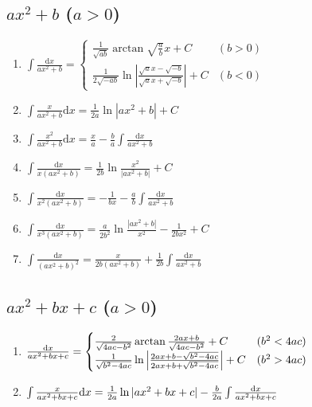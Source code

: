 \subsection{$ax^2+b$ ($a>0$)}

	\begin{enumerate}

	\item $ \int \frac{\mathrm{d}x}{ax^2+b} = \begin{cases}
	\frac{1}{\sqrt{ab}} \arctan \sqrt{\frac{a}{b}} x + C & (b > 0) \\
	\frac{1}{2\sqrt{-ab}} \ln\left| \frac{\sqrt{a}x-\sqrt{-b}}{\sqrt{a}x+\sqrt{-b}} \right| + C & (b < 0)
	\end{cases} $

	\item $ \int \frac{x}{ax^2+b} \mathrm{d}x = \frac{1}{2a} \ln \left| ax^2 + b \right| + C $

	\item $ \int \frac{x^2}{ax^2+b} \mathrm{d}x = \frac{x}{a} - \frac{b}{a}\int \frac{\mathrm{d}x}{ax^2+b} $

	\item $ \int \frac{\mathrm{d}x}{x(ax^2+b)} = \frac{1}{2b} \ln \frac{x^2}{|ax^2+b|} + C $

	\item $ \int \frac{\mathrm{d}x}{x^2(ax^2+b)} = -\frac{1}{bx} - \frac{a}{b} \int \frac{\mathrm{d}x}{ax^2+b} $

	\item $ \int \frac{\mathrm{d}x}{x^3(ax^2+b)} = \frac{a}{2b^2} \ln \frac{|ax^2+b|}{x^2} - \frac{1}{2bx^2} + C $

	\item $ \int \frac{\mathrm{d}x}{(ax^2+b)^2} = \frac{x}{2b(ax^2+b)} + \frac{1}{2b} \int \frac{\mathrm{d}x}{ax^2+b} $

	\end{enumerate}

	\subsection{$ax^2+bx+c$ ($a>0$)}

	\begin{enumerate}

	\item $ \frac{\mathrm{d} x}{ax^2+bx+c} = \begin{cases}
	\frac{2}{\sqrt{4ac-b^2}}\arctan\frac{2ax+b}{\sqrt{4ac-b^2}} + C & (b^2 < 4ac) \\
	\frac{1}{\sqrt{b^2-4ac}}\ln\left| \frac{2ax+b-\sqrt{b^2-4ac}}{2ax+b+\sqrt{b^2-4ac}} \right| + C & (b^2 > 4ac)
	\end{cases} $

	\item $ \int \frac{x}{ax^2+bx+c} \mathrm{d} x = \frac{1}{2a} \ln |ax^2+bx+c| - \frac{b}{2a} \int \frac{\mathrm{d} x}{ax^2+bx+c} $

	\end{enumerate}


